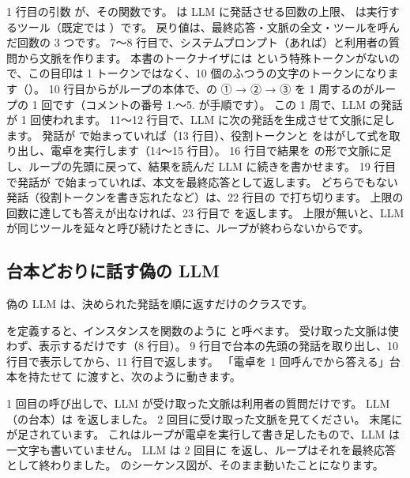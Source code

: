1 行目の引数  が、その関数です。
 は LLM に発話させる回数の上限、 は実行するツール（既定では ）です。
戻り値は、最終応答・文脈の全文・ツールを呼んだ回数の 3 つです。
7〜8 行目で、システムプロンプト（あれば）と利用者の質問から文脈を作ります。
本書のトークナイザには  という特殊トークンがないので、この目印は 1 トークンではなく、10 個のふつうの文字のトークンになります（）。
10 行目からがループの本体で、の ① → ② → ③ を 1 周するのがループの 1 回です（コメントの番号 1.〜5. が手順です）。
この 1 周で、LLM の発話が 1 回使われます。
11〜12 行目で、LLM に次の発話を生成させて文脈に足します。
発話が  で始まっていれば（13 行目）、役割トークンと  をはがして式を取り出し、電卓を実行します（14〜15 行目）。
16 行目で結果を  の形で文脈に足し、ループの先頭に戻って、結果を読んだ LLM に続きを書かせます。
19 行目で発話が  で始まっていれば、本文を最終応答として返します。
どちらでもない発話（役割トークンを書き忘れたなど）は、22 行目の  で打ち切ります。
上限の回数に達しても答えが出なければ、23 行目で  を返します。
上限が無いと、LLM が同じツールを延々と呼び続けたときに、ループが終わらないからです。

\subsection{台本どおりに話す偽の LLM}

偽の LLM は、決められた発話を順に返すだけのクラスです。


 を定義すると、インスタンスを関数のように  と呼べます。
受け取った文脈は使わず、表示するだけです（8 行目）。
9 行目で台本の先頭の発話を取り出し、10 行目で表示してから、11 行目で返します。
「電卓を 1 回呼んでから答える」台本を持たせて  に渡すと、次のように動きます。


1 回目の呼び出しで、LLM が受け取った文脈は利用者の質問だけです。
LLM（の台本）は  を返しました。
2 回目に受け取った文脈を見てください。
末尾に  が足されています。
これはループが電卓を実行して書き足したもので、LLM は一文字も書いていません。
LLM は 2 回目に  を返し、ループはそれを最終応答として終わりました。
のシーケンス図が、そのまま動いたことになります。

